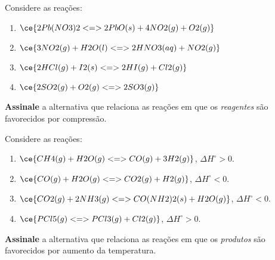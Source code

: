 \begin{problem}[
	id={2F34},
	path={/home/braun/Documents/Developer/braunchem/data/problems/Q2/2F/2F34}
]
Considere as reações:

\begin{enumerate}
\def\labelenumi{\arabic{enumi}.}
\tightlist
\item
  {\(\ce{ 2 Pb(NO3)2 <=> 2 PbO(s) + 4 NO2(g) + O2(g) }\)}
\item
  {\(\ce{ 3 NO2(g) + H2O(l) <=> 2 HNO3(aq) + NO2(g) }\)}
\item
  {\(\ce{ 2 HCl(g) + I2(s) <=> 2 HI(g) + Cl2(g) }\)}
\item
  {\(\ce{ 2 SO2(g) + O2(g) <=> 2 SO3(g) }\)}
\end{enumerate}

\textbf{Assinale} a alternativa que relaciona as reações em que os \emph{reagentes} são favorecidos por compressão.
\end{problem}


\begin{problem}[
	id={2F35},
	path={/home/braun/Documents/Developer/braunchem/data/problems/Q2/2F/2F35}
]
Considere as reações:

\begin{enumerate}
\def\labelenumi{\arabic{enumi}.}
\tightlist
\item
  {\(\ce{ CH4(g) + H2O(g) <=> CO(g) + 3 H2(g) }\)}, {\(\Delta H^\circ > 0\)}.
\item
  {\(\ce{ CO(g) + H2O(g) <=> CO2(g) + H2(g) }\)}, {\(\Delta H^\circ < 0\)}.
\item
  {\(\ce{ CO2(g) + 2 NH3(g) <=> CO(NH2)2(s) + H2O(g) }\)}, {\(\Delta H^\circ < 0\)}.
\item
  {\(\ce{ PCl5(g) <=> PCl3(g) + Cl2(g) }\)}, {\(\Delta H^\circ > 0\)}.
\end{enumerate}

\textbf{Assinale} a alternativa que relaciona as reações em que os \emph{produtos} são favorecidos por aumento da temperatura.
\end{problem}


